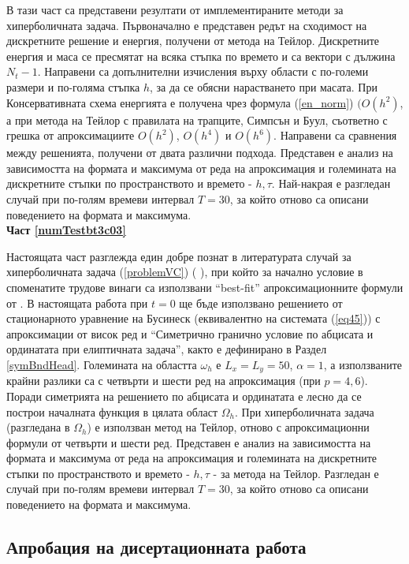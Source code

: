 \documentclass[a4paper]{article}
\newcommand{\rf}[1]{(\ref{#1})}
\theoremstyle{remark}
\begin{document}
\begin{large}
В тази част са представени резултати от имплементираните методи за хиперболичната задача.
Първоначално е представен редът на сходимост на дискретните решение и енергия, получени от метода на Тейлор. Дискретните енергия и маса се пресмятат на всяка стъпка по времето и са вектори с дължина $N_t - 1$. Направени са допълнителни изчисления върху области с по-големи размери и по-голяма стъпка $h$, за да се обясни нарастването при масата. При Консервативната схема енергията е получена чрез формула \rf{en_norm} $(O(h^{2})$, а при метода на Тейлор с правилата на трапците, Симпсън и Буул, съответно с грешка от апроксимациите $O(h^{2})$, $O(h^{4})$ и $O(h^{6})$. Направени са сравнения между решенията, получени от двата различни подхода. Представен е анализ на зависимостта на формата и максимума от реда на апроксимация и големината на дискретните стъпки по пространството и времето - $h, \tau$.  Най-накрая е разгледан случай при по-голям времеви интервал $T=30$, за който отново са описани поведението на формата и максимума.\\

\textbf{Част \ref{numTestbt3c03}}

Настоящата част разглежда един добре познат в литературата случай за хиперболичната задача \rf{problemVC} ( \cite{ref21, ref20, ref23, ref22} ), при който за начално условие в споменатите трудове винаги са използвани ``best-fit'' апроксимационните формули от \cite{ref15}. В настоящата работа при $t=0$ ще бъде използвано решението от стационарното уравнение на Бусинеск (еквивалентно на системата \rf{eq45}) с апроксимации от висок ред и  ``Симетрично гранично условие по абцисата и ординатата при елиптичната задача'', както е дефинирано в Раздел \ref{symBndHead}. Големината на областта $\omega_h$ е $L_x = L_y = 50$, $\alpha = 1$, а използваните крайни разлики са с четвърти и шести ред на апроксимация (при $p=4, 6$). Поради симетрията на решението по абцисата и ординатата е лесно да се построи началната функция в цялата област $\Omega_h$. При хиперболичната задача (разгледана в $\Omega_h$) е използван метод на Тейлор, отново с апроксимационни формули от четвърти и шести ред. Представен е анализ на зависимостта на формата и максимума от реда на апроксимация и големината на дискретните стъпки по пространството и времето - $h, \tau$ - за метода на Тейлор. Разгледан е случай при по-голям времеви интервал $T=30$, за който отново са описани поведението на формата и максимума.\\

\subsection{Апробация на дисертационната работа}\label{approb}


\end{large}
\end{document}
